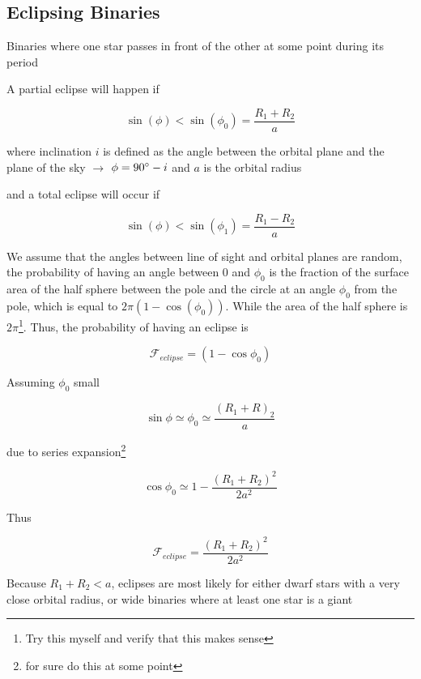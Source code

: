 \documentclass{article}
\begin{document}
\subsection{Eclipsing Binaries}
Binaries where one star passes in front of the other at some point during its period
\begin{list}{-}{}
\item A partial eclipse will happen if  
\item \[\sin(\phi) < \sin(\phi_0) = \frac{R_1+R_2}{a}\]
\item where inclination \(i\) is defined as the angle between the orbital plane and the plane of the sky \(\rightarrow\) \(\phi = 90 \degree - i\) and \(a\) is the orbital radius  
\item and a total eclipse will occur if 
\item \[\sin(\phi) < \sin(\phi_1) = \frac{R_1-R_2}{a}\]
\item We assume that the angles between line of sight and orbital planes are random, the probability of having an angle between 0 and \(\phi_0\) is the fraction of the surface area of the half sphere between the pole and the circle at an angle \(\phi_0\) from the pole, which is equal to \(2\pi(1-\cos(\phi_0))\). While the area of the half sphere is \(2\pi\)\footnote{Try this myself and verify that this makes sense}. Thus, the probability of having an eclipse is 
\item \[\mathcal{F}_{eclipse} = (1-\cos\phi_0)\]
\item Assuming \(\phi_0\) small
\item \[\sin\phi \simeq \phi_0 \simeq \frac{(R_1 +R)_2}{a}\]
\item due to series expansion\footnote{for sure do this at some point}
\item \[\cos\phi_0 \simeq 1 - \frac{(R_1 + R_2)^2}{2a^2}\]
\item Thus
\item \[\mathcal{F}_{eclipse} =\frac{(R_1 + R_2)^2}{2a^2} \]
\item Because \(R_1 +R_2 < a\), eclipses are most likely for either dwarf stars with a  very close orbital radius, or wide binaries where at least one star is a giant 
\end{list}
\end{document}
